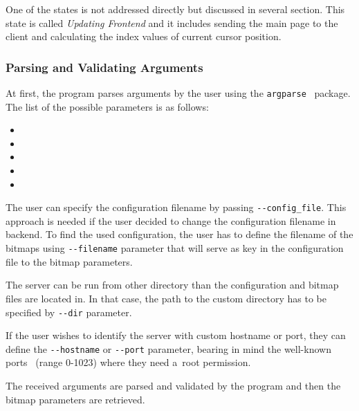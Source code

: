 One of the states is not addressed directly but discussed in several section.
This state is called \textit{Updating Frontend} and it includes sending the
main page to the client and calculating the index values of current cursor position.

\subsubsection{Parsing and Validating Arguments}\label{sec:server_params}
At first, the program parses arguments by the user using the \texttt{argparse}~\cite{argparse} package.
The list of the possible parameters is as follows:

\begin{itemize}
  \item {} 
  \item {} 
  \item {} 
  \item {} 
  \item {} 
\end{itemize}

The user can specify the configuration filename by passing \texttt{-{}-config\_file}. This approach is needed if the user
decided to change the configuration filename in backend. To find the used configuration, the user has to define
the filename of the bitmaps using \texttt{-{}-filename} parameter that will serve as key in the configuration file to the bitmap parameters.

The server can be run from other directory than the configuration and bitmap files are located in.
In that case, the path to the custom directory has to be specified by \texttt{-{}-dir} parameter.

If the user wishes to identify the server with custom hostname or port,
they can define the \texttt{-{}-hostname} or \texttt{-{}-port} parameter,
bearing in mind the well-known ports~\cite{port_registry} (range 0-1023)
where they need a~root permission.

The received arguments are parsed and validated by the program and then the bitmap parameters are retrieved.


